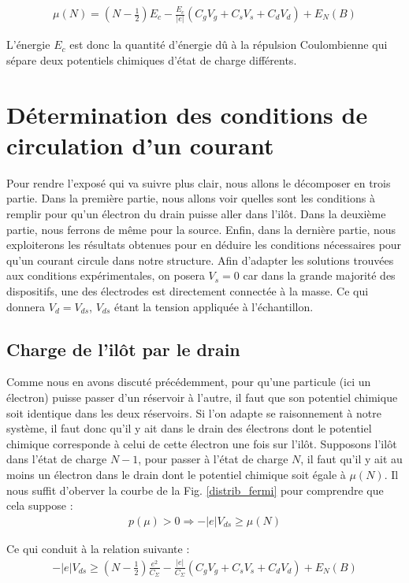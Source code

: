 \begin{eqnarray}
\mu(N) = (N-\frac{1}{2})E_c
- 
\frac{E_c}{|e|}(C_gV_g + C_sV_s + C_dV_d)
+
E_N(B)
\label{pot_chim}
\end{eqnarray}

L'énergie $E_c$ est donc la quantité d'énergie d\^u à la répulsion Coulombienne qui sépare deux potentiels chimiques d'état de charge différents.


\section{Détermination des conditions de circulation d'un courant}
Pour rendre l'exposé qui va suivre plus clair, nous allons le décomposer en trois partie. Dans la première partie, nous allons voir quelles sont les conditions à remplir pour qu'un électron du drain puisse aller dans l'il\^ot. Dans la deuxième partie, nous ferrons de m\^eme pour la source. Enfin, dans la dernière partie, nous exploiterons les résultats obtenues pour en déduire les conditions nécessaires pour qu'un courant circule dans notre structure. Afin d'adapter les solutions trouvées aux conditions expérimentales, on posera $V_s = 0$ car dans la grande majorité des dispositifs, une des électrodes est directement connectée à la masse. Ce qui donnera $V_d=V_{ds}$, $V_{ds}$ étant la tension appliquée à l'échantillon.

\subsection{Charge de l'il\^ot par le drain}
Comme nous en avons discuté précédemment, pour qu'une particule (ici un électron) puisse passer d'un réservoir à l'autre, il faut que son potentiel chimique soit identique dans les deux réservoirs. Si l'on adapte se raisonnement à notre système, il faut donc qu'il y ait dans le drain des électrons dont le potentiel chimique corresponde à celui de cette électron une fois sur l'il\^ot. Supposons l'il\^ot dans l'état de charge $N-1$, pour passer à l'état de charge $N$, il faut qu'il y ait au moins un électron dans le drain dont le potentiel chimique soit égale à $\mu(N)$. Il nous suffit d'oberver la courbe de la Fig. \ref{distrib_fermi} pour comprendre que cela suppose :
\begin{eqnarray}
p(\mu) > 0 \Longrightarrow  -|e|V_{ds} \geq \mu(N) \nonumber
\end{eqnarray}

Ce qui conduit à la relation suivante :
\begin{eqnarray}
-|e|V_{ds} \geq (N-\frac{1}{2})\frac{e^2}{C_{\Sigma}}
-
\frac{|e|}{C_{\Sigma}}(C_gV_g + C_sV_s + C_dV_d)
+
E_N(B) \nonumber
\end{eqnarray}

